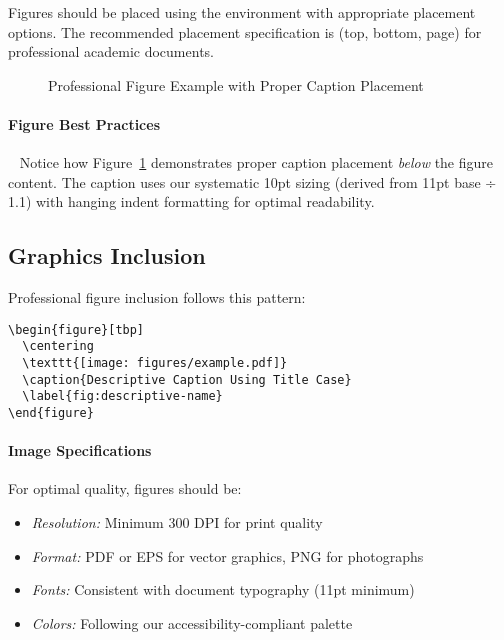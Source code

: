 \documentclass[11pt]{article}
\begin{document}
Figures should be placed using the  environment with appropriate placement options. The recommended placement specification is \code{[tbp]} (top, bottom, page) for professional academic documents.

\begin{figure}[tbp]
  \centering
  \caption{Professional Figure Example with Proper Caption Placement}
  \label{fig:professional-example}
  \begin{fignotes}
  \end{fignotes}
\end{figure}

\paragraph{Figure Best Practices}~ Notice how Figure~\ref{fig:professional-example} demonstrates proper caption placement \emph{below} the figure content. The caption uses our systematic 10pt sizing (derived from 11pt base ÷ 1.1) with hanging indent formatting for optimal readability.

\subsection{Graphics Inclusion}

Professional figure inclusion follows this pattern:

\begin{verbatim}
\begin{figure}[tbp]
  \centering
  \texttt{[image: figures/example.pdf]}
  \caption{Descriptive Caption Using Title Case}
  \label{fig:descriptive-name}
\end{figure}
\end{verbatim}

\paragraph{Image Specifications} For optimal quality, figures should be:
\begin{itemize}
\item \emph{Resolution:} Minimum 300 DPI for print quality
\item \emph{Format:} PDF or EPS for vector graphics, PNG for photographs
\item \emph{Fonts:} Consistent with document typography (11pt minimum)
\item \emph{Colors:} Following our accessibility-compliant palette
\end{itemize}
\end{document}
